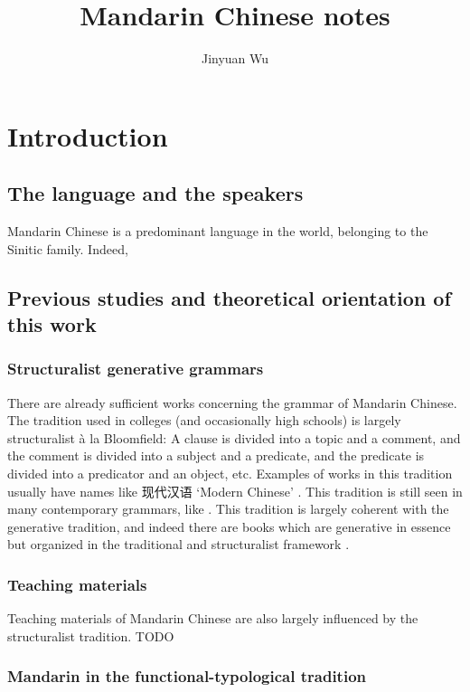 \documentclass[UTF8, a4paper, oneside, scheme=plain]{ctexrep}
\title{Mandarin Chinese notes}
\author{Jinyuan Wu}
\newcommand{\ala}{à la}
\newcommand{\translate}[1]{`#1'}
\begin{document}
\maketitle

\automath

\chapter{Introduction}

\section{The language and the speakers}

Mandarin Chinese is a predominant language in the world,
belonging to the Sinitic family.
Indeed,  

\section{Previous studies and theoretical orientation of this work}

\subsection{Structuralist generative grammars}

There are already sufficient works concerning the grammar of Mandarin Chinese.
The tradition used in colleges (and occasionally high schools) 
is largely structuralist \ala{} Bloomfield:
A clause is divided into a topic and a comment,
and the comment is divided into a subject and a predicate,
and the predicate is divided into a predicator and an object, etc.
Examples of works in this tradition usually have names like 现代汉语 \translate{Modern Chinese}
\citep{xianhan2004}.
This tradition is still seen in many contemporary grammars,
like \citet{cgel}.
This tradition is largely coherent with the generative tradition,
and indeed there are books which are generative in essence 
but organized in the traditional and structuralist framework \citep{deng2010formal}.

\subsection{Teaching materials}

Teaching materials of Mandarin Chinese are also largely influenced by the structuralist tradition.
TODO

\subsection{Mandarin in the functional-typological tradition}
\end{document}
